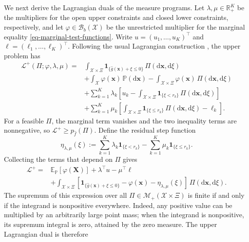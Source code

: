 We next derive the Lagrangian duals of the measure programs. Let $\lambda,\mu\in\mathbb R_+^K$ be the multipliers for the open upper constraints and closed lower constraints, respectively, and let $\varphi\in\mathcal B_b(\mathcal X)$ be the unrestricted multiplier for the marginal equality \eqref{eq-marginal-test-functions}. Write $u=(u_1,\ldots,u_K)^\top$ and $\ell=(\ell_1,\ldots,\ell_K)^\top$. Following the usual Lagrangian construction \citep[Section~5.1]{B.V04}, the upper problem has
\begin{equation}
  \begin{aligned}
    \mathcal L^+\left(\Pi;\varphi,\lambda,\mu\right)={}&
    \int_{\mathcal X\times\Xi}\mathbf1_{\{\hat g(\bm x)+\xi\le0\}}\,\Pi\left(\mathrm d\bm x,\mathrm d\xi\right)\\
    &+\int_{\mathcal X}\varphi(\bm x)\,\mathbb P\left(\mathrm d\bm x\right)
    -\int_{\mathcal X\times\Xi}\varphi(\bm x)\,\Pi\left(\mathrm d\bm x,\mathrm d\xi\right)\\
    &+\sum_{k=1}^K\lambda_k
    \left[u_k-\int_{\mathcal X\times\Xi}\mathbf1_{\{\xi<r_k\}}\,\Pi\left(\mathrm d\bm x,\mathrm d\xi\right)\right]\\
    &+\sum_{k=1}^K\mu_k
    \left[\int_{\mathcal X\times\Xi}\mathbf1_{\{\xi\le r_k\}}\,\Pi\left(\mathrm d\bm x,\mathrm d\xi\right)-\ell_k\right].
  \end{aligned}
  \label{eq-upper-lagrangian}
\end{equation}
For a feasible $\Pi$, the marginal term vanishes and the two inequality terms are nonnegative, so $\mathcal L^+\ge p_{\hat f}(\Pi)$. Define the residual step function
\begin{equation}
  \eta_{\lambda,\mu}(\xi):=
  \sum_{k=1}^K\lambda_k\mathbf1_{\{\xi<r_k\}}
  -\sum_{k=1}^K\mu_k\mathbf1_{\{\xi\le r_k\}}.
  \label{eq-dual-step-function}
\end{equation}
Collecting the terms that depend on $\Pi$ gives
\begin{equation}
  \begin{aligned}
    \mathcal L^+={}&\mathbb E_{\mathbb P}\left[\varphi(\bm X)\right]
    +\lambda^\top u-\mu^\top\ell\\
    &+\int_{\mathcal X\times\Xi}
    \left[\mathbf1_{\{\hat g(\bm x)+\xi\le0\}}-\varphi(\bm x)
    -\eta_{\lambda,\mu}(\xi)\right]\,\Pi\left(\mathrm d\bm x,\mathrm d\xi\right).
  \end{aligned}
  \label{eq-collected-upper-lagrangian}
\end{equation}
The supremum of this expression over all $\Pi\in\mathcal M_+(\mathcal X\times\Xi)$ is finite if and only if the integrand is nonpositive everywhere. Indeed, any positive value can be multiplied by an arbitrarily large point mass; when the integrand is nonpositive, its supremum integral is zero, attained by the zero measure. The upper Lagrangian dual is therefore
